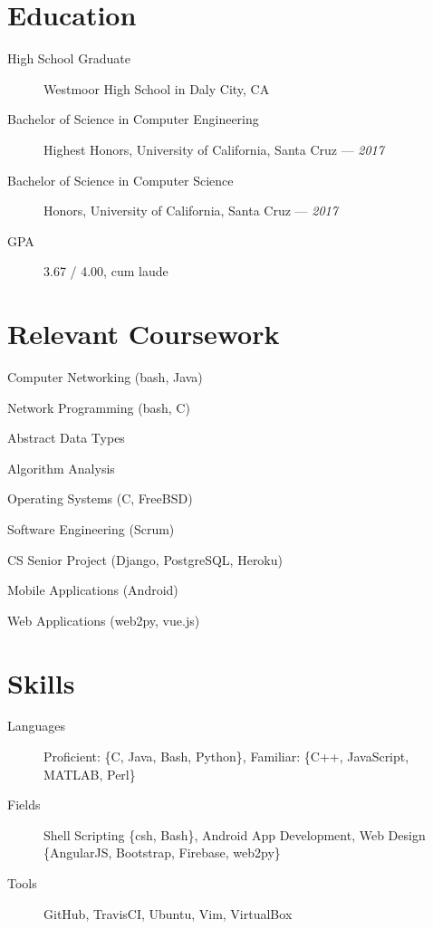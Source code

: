 \documentclass[10pt]{article}
\author{August Valera}
\begin{document}

\section*{Education}
\begin{description}
  \item[High School Graduate] Westmoor High School in Daly City, CA
  \item[Bachelor of Science in Computer Engineering] Highest Honors, University of California, Santa Cruz --- \textit{2017}
  \item[Bachelor of Science in Computer Science] Honors, University of California, Santa Cruz --- \textit{2017}
  \item[GPA] 3.67 / 4.00, cum laude
\end{description}

\section*{Relevant Coursework}
\begin{itemize}
    \begin{multicols}{2}
    \item Computer Networking (bash, Java) %
    \item Network Programming (bash, C) %
    \item Abstract Data Types %
    \item Algorithm Analysis %
    \item Operating Systems (C, FreeBSD) %
    \item Software Engineering (Scrum) %
    \item CS Senior Project (Django, PostgreSQL, Heroku) %
    \item Mobile Applications (Android) %
    \item Web Applications (web2py, vue.js) %
    \end{multicols}
\end{itemize}

\section*{Skills}
\begin{description}
  \item[Languages] Proficient: \{C, Java, Bash, Python\},
    Familiar: \{C++, JavaScript, MATLAB, Perl\}
  \item[Fields] Shell Scripting \{csh, Bash\}, Android App Development, Web
    Design \{AngularJS, Bootstrap, Firebase, web2py\}
  \item[Tools] GitHub, TravisCI, Ubuntu, Vim, VirtualBox
\end{description}
\end{document}
